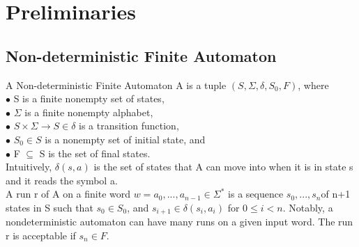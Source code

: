 \section{Preliminaries}

\subsection{Non-deterministic Finite Automaton}
\noindent
A Non-deterministic Finite Automaton A is a tuple $(S,\Sigma,\delta,S_0,F)$, where \\
$\bullet $ S is a finite nonempty set of states,\\
$\bullet $ $\Sigma$ is a finite nonempty alphabet,\\
$\bullet $ $ S \times \Sigma \to S \in \delta$ is a transition function, \\
$\bullet $ $S_0 \in S$ is a nonempty set of initial state, and \\
$\bullet $ F $\subseteq $ S is the set of final states.\\
Intuitively, $\delta(s, a)$ is the set of states that A can move into when it is in state s and it reads the symbol a.  \\
A run r of A on a finite word $w = a_0, ..., a_{n-1} \in \Sigma^{*}$ is a sequence $s_0, ..., s_n $of n+1 states in S such that $s_0 \in S_0$, and $s_{i+1} \in \delta(s_i, a_i)$ for $0 \leq i < n$. Notably, a nondeterministic automaton can have many runs on a given input word. The run r is acceptable if $s_n \in F$.   

